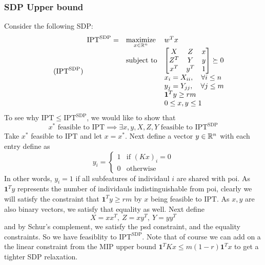 \documentclass[12pt]{article}
\newcommand{\priv}{\text{IPT}}
\newcommand{\privsdp}{\text{IPT}^\text{SDP}}
\begin{document}
\subsubsection{SDP Upper bound}
Consider the following SDP:
\begin{equation}
	\label{eq:privsdp} 
    \tag{$\privsdp$} 
	\begin{array}{lll}
		\privsdp = & \underset{x\in\mr^n}{\text{maximize}} & w^T x \\
		& \mbox{subject to} &  
        \begin{bmatrix}
            \begin{matrix}
                X
            \end{matrix}  & 
            \begin{matrix}
                Z
            \end{matrix} & x \\
            \begin{matrix}
                Z^T 
            \end{matrix} & 
            \begin{matrix}
                Y 
            \end{matrix} & y \\
            x^T & y^T & 1
        \end{bmatrix} \succeq 0\\
        && x_i = X_{ii}, \quad \forall i\leq n\\
        && y_j = Y_{jj}, \quad \forall j \leq m\\
        && \mathbf{1}^Ty \geq rm \\
        && 0 \leq x,y \leq 1
		\end{array}
\end{equation}
To see why $\priv \leq \privsdp$, we would like to show that
\[x^* \text{ feasible to } \priv \implies \exists x,y,X,Z,Y \text{ feasible to }\privsdp\] 
Take $x^*$ feasible to $\priv$ and let $x = x^*$. Next define a vector $y \in \mathbb{R}^n$ with each entry define as
\[y_i = \begin{cases}
    1 & \text{if } (Kx)_i = 0 \\
    0 & \text{otherwise}
\end{cases}\]
In other words, $y_i = 1$ if all subfeatures of individaul $i$ are shared with \gls{poi}. As $\mathbf{1}^Ty$ represents the number of individauls indistinguishable from \gls{poi}, clearly we will satisfy the constraint that $\mathbf{1}^Ty \geq rm$ by $x$ being feasible to $\priv$. As $x,y$ are also binary vectors, we satisfy that equality as well. Next define \[X = xx^T, \ Z = xy^T, \ Y = yy^T\]
and by Schur's complement, we satisfy the psd constraint, and the equality constraints. So we have feasiblity to $\privsdp$. Note that of course we can add on a the linear constraint from the MIP upper bound $\mathbf{1}^TKx \leq m(1-r)\mathbf{1}^Tx$ to get a tighter SDP relaxation.
\end{document}
